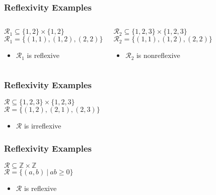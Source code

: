 \documentclass[dvipsnames]{beamer}
\begin{document}
\begin{frame}
  \frametitle{Reflexivity Examples}

  \begin{columns}[t]
    \begin{example}
      $\mathcal{R}_1 \subseteq \{1,2\} \times \{1,2\}$\\
      $\mathcal{R}_1 = \{(1,1), (1,2), (2,2)\}$

      \medskip
      \begin{itemize}
        \item $\mathcal{R}_1$ is reflexive
      \end{itemize}
    \end{example}

    \pause
    \begin{example}
      $\mathcal{R}_2 \subseteq \{1,2,3\} \times \{1,2,3\}$\\
      $\mathcal{R}_2 = \{(1,1), (1,2), (2,2)\}$

      \medskip
      \begin{itemize}
        \item $\mathcal{R}_2$ is nonreflexive
      \end{itemize}
    \end{example}
  \end{columns}
\end{frame}

\begin{frame}
  \frametitle{Reflexivity Examples}

  \begin{example}
    $\mathcal{R} \subseteq \{1,2,3\} \times \{1,2,3\}$\\
    $\mathcal{R} = \{(1,2), (2,1), (2,3)\}$

    \medskip
    \begin{itemize}
      \item $\mathcal{R}$ is irreflexive
    \end{itemize}
  \end{example}
\end{frame}

\begin{frame}
  \frametitle{Reflexivity Examples}

  \begin{example}
    $\mathcal{R} \subseteq \mathbb{Z} \times \mathbb{Z}$\\
    $\mathcal{R} = \{(a,b)~|~ab \geq 0\}$

    \medskip
    \begin{itemize}
      \item $\mathcal{R}$ is reflexive
    \end{itemize}
  \end{example}
\end{frame}
\end{document}
